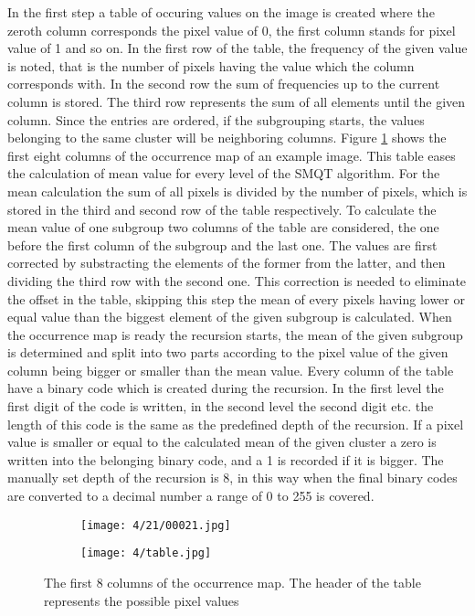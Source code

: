 \documentclass[draft,final]{vutinfth} %
\begin{document}
In the first step a table of occuring values on the image is created where the zeroth column corresponds the pixel value of 0, the first column stands for pixel value of 1 and so on.
In the first row of the table, the frequency of the given value is noted, that is the number of pixels having the value which the column corresponds with.
In the second row the sum of frequencies up to the current column is stored.
The third row represents the sum of all elements until the given column.
Since the entries are ordered, if the subgrouping starts, the values belonging to the same cluster will be neighboring columns.
Figure \ref{fig:fans:table} shows the first eight columns of the occurrence map of an example image.
This table eases the calculation of mean value for every level of the SMQT algorithm.
For the mean calculation the sum of all pixels is divided by the number of pixels, which is stored in the third and second row of the table respectively. 
To calculate the mean value of one subgroup two columns of the table are considered, the one before the first column of the subgroup and the last one.
The values are first corrected by substracting the elements of the former from the latter, and then dividing the third row with the second one.
This correction is needed to eliminate the offset in the table, skipping this step the mean of every pixels having lower or equal value than the biggest element of the given subgroup is calculated.
When the occurrence map is ready the recursion starts, the mean of the given subgroup is determined and split into two parts according to the pixel value of the given column being bigger or smaller than the mean value. 
Every column of the table have a binary code which is created during the recursion.
In the first level the first digit of the code is written, in the second level the second digit etc. the length of this code is the same as the predefined depth of the recursion.
If a pixel value is smaller or equal to the calculated mean of the given cluster a zero is written into the belonging binary code, and a 1 is recorded if it is bigger.
The manually set depth of the recursion is 8, in this way when the final binary codes are converted to a decimal number a range of 0 to 255 is covered.
\begin{figure}[h]
  \centering
  \begin{subfigure}[t]{0.09\columnwidth}
    \centering
    \texttt{[image: 4/21/00021.jpg]}
  \end{subfigure}
  \begin{subfigure}[t]{0.9\columnwidth}
    \centering
    \texttt{[image: 4/table.jpg]}
  \end{subfigure}
  \caption{The first 8 columns of the occurrence map. The header of the table represents the possible pixel values }
  \label{fig:fans:table} %
\end{figure}
\end{document}
